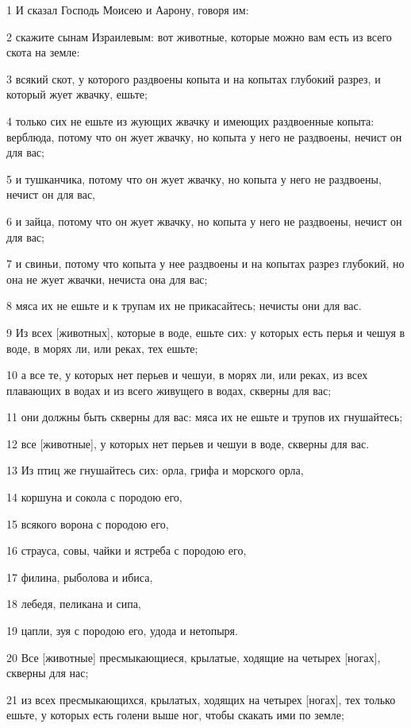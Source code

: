 \par 1 И сказал Господь Моисею и Аарону, говоря им:
\par 2 скажите сынам Израилевым: вот животные, которые можно вам есть из всего скота на земле:
\par 3 всякий скот, у которого раздвоены копыта и на копытах глубокий разрез, и который жует жвачку, ешьте;
\par 4 только сих не ешьте из жующих жвачку и имеющих раздвоенные копыта: верблюда, потому что он жует жвачку, но копыта у него не раздвоены, нечист он для вас;
\par 5 и тушканчика, потому что он жует жвачку, но копыта у него не раздвоены, нечист он для вас,
\par 6 и зайца, потому что он жует жвачку, но копыта у него не раздвоены, нечист он для вас;
\par 7 и свиньи, потому что копыта у нее раздвоены и на копытах разрез глубокий, но она не жует жвачки, нечиста она для вас;
\par 8 мяса их не ешьте и к трупам их не прикасайтесь; нечисты они для вас.
\par 9 Из всех [животных], которые в воде, ешьте сих: у которых есть перья и чешуя в воде, в морях ли, или реках, тех ешьте;
\par 10 а все те, у которых нет перьев и чешуи, в морях ли, или реках, из всех плавающих в водах и из всего живущего в водах, скверны для вас;
\par 11 они должны быть скверны для вас: мяса их не ешьте и трупов их гнушайтесь;
\par 12 все [животные], у которых нет перьев и чешуи в воде, скверны для вас.
\par 13 Из птиц же гнушайтесь сих: орла, грифа и морского орла,
\par 14 коршуна и сокола с породою его,
\par 15 всякого ворона с породою его,
\par 16 страуса, совы, чайки и ястреба с породою его,
\par 17 филина, рыболова и ибиса,
\par 18 лебедя, пеликана и сипа,
\par 19 цапли, зуя с породою его, удода и нетопыря.
\par 20 Все [животные] пресмыкающиеся, крылатые, ходящие на четырех [ногах], скверны для нас;
\par 21 из всех пресмыкающихся, крылатых, ходящих на четырех [ногах], тех только ешьте, у которых есть голени выше ног, чтобы скакать ими по земле;
